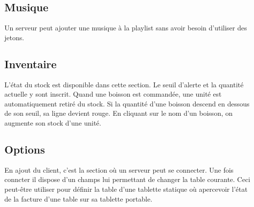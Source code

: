 \documentclass[a4paper,11pt]{article}
\begin{document}
\subsection{Musique}
Un serveur peut ajouter une musique à la playlist sans avoir besoin d'utiliser des jetons.

\subsection{Inventaire}
L'état du stock est disponible dans cette section. Le seuil d'alerte et la quantité actuelle y sont inscrit. Quand une boisson est commandée, une unité est automatiquement retiré du stock. Si la quantité d'une boisson descend en dessous de son seuil, sa ligne devient rouge. En cliquant sur le nom d'un boisson, on augmente son stock d'une unité.

\subsection{Options}

En ajout du client, c'est la section où un serveur peut se connecter. Une fois conncter il dispose d'un champs lui permettant de changer la table courante. Ceci peut-être utiliser pour définir la table d'une tablette statique où apercevoir l'état de la facture d'une table sur sa tablette portable.
\end{document}
